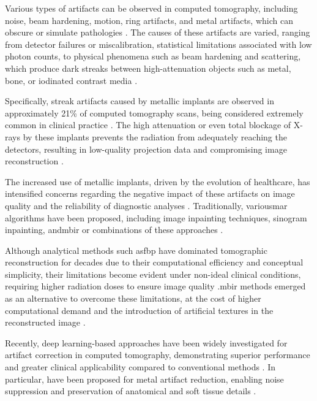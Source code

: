 Various types of artifacts can be observed in computed tomography, including noise, beam hardening, motion, ring artifacts, and metal artifacts, which can obscure or simulate pathologies \cite{boasCTArtifactsCauses2012}. The causes of these artifacts are varied, ranging from detector failures or miscalibration, statistical limitations associated with low photon counts, to physical phenomena such as beam hardening and scattering, which produce dark streaks between high-attenuation objects such as metal, bone, or iodinated contrast media \cite{schulzHowCTHappened2021}.

Specifically, streak artifacts caused by metallic implants are observed in approximately 21\% of computed tomography scans, being considered extremely common in clinical practice \cite{schulzHowCTHappened2021}. The high attenuation or even total blockage of X-rays by these implants prevents the radiation from adequately reaching the detectors, resulting in low-quality projection data and compromising image reconstruction \cite{kleberAdvancementsSupervisedDeep2024}.

The increased use of metallic implants, driven by the evolution of healthcare, has intensified concerns regarding the negative impact of these artifacts on image quality and the reliability of diagnostic analyses \cite{kleberAdvancementsSupervisedDeep2024}. Traditionally, various\acrfull{mar} algorithms have been proposed, including image inpainting techniques, sinogram inpainting, and\acrfull{mbir} or combinations of these approaches \cite{puvanasunthararajahApplicationMetalArtifact2021}.

Although analytical methods such as\acrfull{fbp} have dominated tomographic reconstruction for decades due to their computational efficiency and conceptual simplicity, their limitations become evident under non-ideal clinical conditions, requiring higher radiation doses to ensure image quality \cite{sahuTransformingCTImaging2025}.\acrshort{mbir} methods emerged as an alternative to overcome these limitations, at the cost of higher computational demand and the introduction of artificial textures in the reconstructed image \cite{sahuTransformingCTImaging2025}.

Recently, deep learning-based approaches have been widely investigated for artifact correction in computed tomography, demonstrating superior performance and greater clinical applicability compared to conventional methods \cite{alkhodariEnhancingCCTAImage2025}. In particular, have been proposed for metal artifact reduction, enabling noise suppression and preservation of anatomical and soft tissue details \cite{alkhodariEnhancingCCTAImage2025}.


